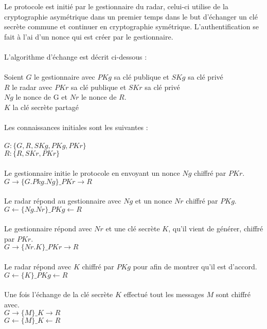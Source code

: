 \documentclass[]{scrartcl}
\begin{document}
Le protocole est initié par le gestionnaire du radar, celui-ci utilise de la cryptographie asymétrique dans un premier temps dans le but d'échanger un clé secrète commune et continuer en cryptographie symétrique. L'authentification se fait à l'ai d'un nonce qui est créer par le gestionnaire.
\\
\\
L'algorithme d'échange est décrit ci-dessous : 
\\
\\
Soient 
$G$ le gestionnaire avec $PKg$ sa clé publique et  $SKg$ sa clé privé
\\
$R$ le radar avec $PKr$ sa clé publique et  $SKr$ sa clé privé
\\
$Ng$ le nonce de G et $Nr$ le nonce de $R$.
\\
$K$ la clé secrète partagé
\\
\\
Les connaissances initiales sont les suivantes :
\\
\\
$G : \{G, R, SKg, PKg, PKr\}$
\\
$R : \{R, SKr, PKr\}$
\\
\\
Le gestionnaire initie le protocole en envoyant un nonce $Ng$ chiffré par $PKr$.
\\
$G \rightarrow \{G.Pkg.Ng\}\_PKr \longrightarrow R$
\\
\\
Le radar répond au gestionnaire avec $Ng$ et un nonce $Nr$ chiffré par $PKg$.
\\
$G \longleftarrow \{Ng.Nr\}\_PKg \leftarrow R$
\\
\\
Le gestionnaire répond avec $Nr$ et une clé secrète $K$, qu'il vient de générer, chiffré par $PKr$.
\\
$G \rightarrow \{Nr.K\}\_PKr \longrightarrow R$
\\
\\
Le radar répond avec $K$ chiffré par $PKg$ pour afin de montrer qu'il est d'accord.
\\
$G \longleftarrow \{K\}\_PKg \leftarrow R$
\\
\\
Une fois l'échange de la clé secrète $K$ effectué tout les messages $M$ sont chiffré avec.
\\
$G \rightarrow \{M\}\_K \longrightarrow R$
\\
$G \longleftarrow \{M\}\_K \leftarrow R$
\end{document}
